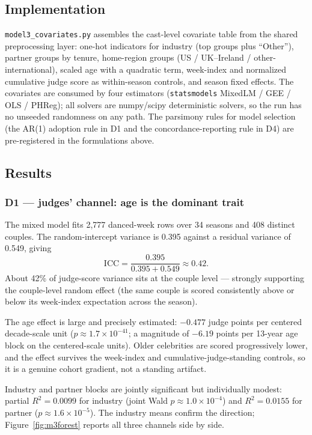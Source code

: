 \documentclass[10pt]{article}
\begin{document}
\subsection{Implementation}

\texttt{model3\_covariates.py} assembles the cast-level covariate table from the shared
preprocessing layer: one-hot indicators for industry (top groups plus ``Other''),
partner groups by tenure, home-region groups (US / UK--Ireland / other-international),
scaled age with a quadratic term, week-index and normalized cumulative judge score as
within-season controls, and season fixed effects. The covariates are consumed by four
estimators (\texttt{statsmodels} MixedLM / GEE / OLS / PHReg); all solvers are
numpy/scipy deterministic solvers, so the run has no unseeded randomness on any path.
The parsimony rules for model selection (the AR(1) adoption rule in D1 and the
concordance-reporting rule in D4) are pre-registered in the formulations above.

\subsection{Results}
\label{sec:m3res}

\subsubsection{D1 --- judges' channel: age is the dominant trait}

The mixed model fits 2{,}777 danced-week rows over 34 seasons and 408 distinct couples.
The random-intercept variance is 0.395 against a residual variance of 0.549, giving
\begin{equation}
\mathrm{ICC} = \frac{0.395}{0.395 + 0.549} \approx 0.42.
\end{equation}
About 42\% of judge-score variance sits at the couple level --- strongly supporting the
couple-level random effect (the same couple is scored consistently above or below its
week-index expectation across the season).

The age effect is large and precisely estimated: $-0.477$ judge points per centered
decade-scale unit ($p \approx 1.7 \times 10^{-41}$; a magnitude of $-6.19$ points per
13-year age block on the centered-scale units). Older celebrities are scored progressively
lower, and the effect survives the week-index and cumulative-judge-standing controls, so it
is a genuine cohort gradient, not a standing artifact.

Industry and partner blocks are jointly significant but individually modest:
partial $R^2 = 0.0099$ for industry (joint Wald $p \approx 1.0 \times 10^{-4}$) and
$R^2 = 0.0155$ for partner ($p \approx 1.6 \times 10^{-5}$). The industry means confirm the
direction; Figure~\ref{fig:m3forest} reports all three channels side by side.
\end{document}
